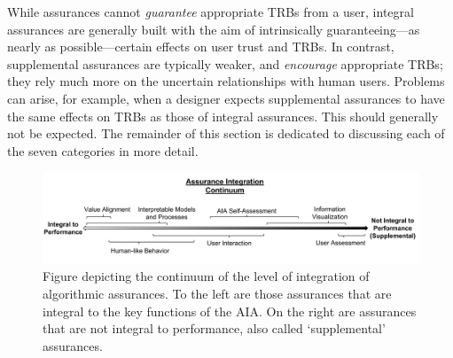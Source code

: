 While assurances cannot \emph{guarantee} appropriate TRBs from a user, integral assurances are generally built with the aim of intrinsically guaranteeing---as nearly as possible---certain effects on user trust and TRBs. In contrast, supplemental assurances are typically weaker, and \emph{encourage} appropriate TRBs; they rely much more on the uncertain relationships with human users. Problems can arise, for example, when a designer expects supplemental assurances to have the same effects on TRBs as those of integral assurances. This should generally not be expected. The remainder of this section is dedicated to discussing each of the seven categories in more detail.

\begin{figure}[!t]%
    \centering
    \includegraphics[width=1.0\textwidth]{Figures/Assurance_Integration.pdf}
    \caption{Figure depicting the continuum of the level of integration of algorithmic assurances. To the left are those assurances that are integral to the key functions of the AIA. On the right are assurances that are not integral to performance, also called `supplemental' assurances.}
    \label{fig:assurance_continuum}
\end{figure}









